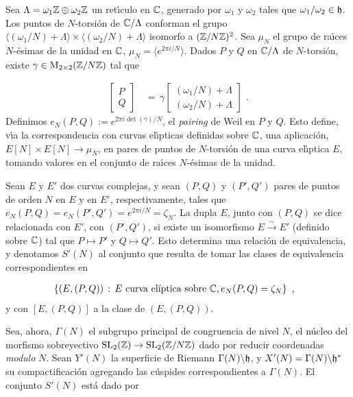 
Sea $\Lambda=\omega_{1}\bb{Z}\oplus\omega_{2}\bb{Z}$ un ret\'{\i}culo en $\bb{C}$,
generado por $\omega_{1}$ y $\omega_{2}$ tales que
$\omega_{1}/\omega_{2}\in\frak{h}$. Los puntos de $N$-torsi\'{o}n de
$\bb{C}/\Lambda$ conforman el grupo
\begin{math}
\langle(\omega_{1}/N)+\Lambda\rangle\times
\langle(\omega_{2}/N)+\Lambda\rangle
\end{math}
isomorfo a $(\bb{Z}/N\bb{Z})^{2}$. Sea $\mu_{N}$ el grupo de ra\'{\i}ces
$N$-\'{e}simas de la unidad en $\bb{C}$, $\mu_{N}=\langle e^{2\pi i/N}\rangle$.
Dados $P$ y $Q$ en $\bb{C}/\Lambda$ de $N$-torsi\'{o}n, existe
$\gamma\in\MM{2}(\bb{Z}/N\bb{Z})$ tal que

\begin{align*}
\begin{bmatrix}
P\\Q
\end{bmatrix} & \,=\,\gamma
\begin{bmatrix}
(\omega_{1}/N)+\Lambda\\(\omega_{2}/N)+\Lambda
\end{bmatrix}\text{ .}
\end{align*}
Definimos $e_{N}(P,Q):=e^{2\pi i\det(\gamma)/N}$, el \textit{pairing} de Weil en
$P$ y $Q$. Esto define, v\'{\i}a la correspondencia con curvas el\'{\i}pticas
definidas sobre $\bb{C}$, una aplicaci\'{o}n,
$E[N]\times E[N]\rightarrow\mu_{N}$, en pares de puntos de $N$-torsi\'{o}n de una
curva el\'{\i}ptica $E$, tomando valores en el conjunto de ra\'{\i}ces
$N$-\'{e}simas de la unidad.

Sean $E$ y $E'$ dos curvas complejas, y sean $(P,Q)$ y $(P',Q')$ pares de puntos de
orden $N$ en $E$ y en $E'$, respectivamente, tales que
$e_{N}(P,Q)=e_{N}(P',Q')=e^{2\pi i/N}=\zeta_{N}$. La dupla $E$, junto con $(P,Q)$
se dice relacionada con $E'$, con $(P',Q')$, si existe un isomorfismo
$E\xrightarrow{\sim}E'$ (definido sobre $\bb{C}$) tal que $P\mapsto P'$ y
$Q\mapsto Q'$. Esto determina una relaci\'{o}n de equivalencia, y denotamos
$S'(N)$ al conjunto que resulta de tomar las clases de equivalencia correspondientes %
en

\begin{align*}
& \left\lbrace (E,(P,Q))\,:\,E\text{ curva el\'{\i}ptica sobre }\bb{C},
e_{N}(P,Q)=\zeta_{N}\right\rbrace\text{ ,}
\end{align*}
y con $[E,(P,Q)]$ a la clase de $(E,(P,Q))$.

Sea, ahora, $\Gamma(N)$ el subgrupo principal de congruencia de nivel $N$, el
n\'{u}cleo del morfismo sobreyectivo
$\SL{2}(\bb{Z})\rightarrow\SL{2}(\bb{Z}/N\bb{Z})$ dado por reducir coordenadas
\textit{modulo} $N$. Sean $Y'(N)$ la superficie de Riemann
$\Gamma(N)\backs\frak{h}$, y $X'(N)=\Gamma(N)\backs\frak{h}^{*}$ su
compactificaci\'{o}n agregando las c\'{u}spides correspondientes a $\Gamma(N)$.
El conjunto $S'(N)$ est\'{a} dado por

